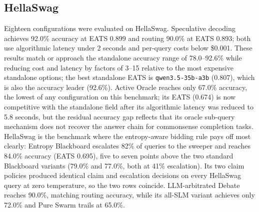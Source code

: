\subsection{HellaSwag}

Eighteen configurations were evaluated on HellaSwag. Speculative decoding achieves 92.0\% accuracy at EATS 0.899 and routing 90.0\% at EATS 0.893; both use algorithmic latency under 2 seconds and per-query costs below \$0.001. These results match or approach the standalone accuracy range of 78.0--92.6\% while reducing cost and latency by factors of 3--15 relative to the most expensive standalone options; the best standalone EATS is \texttt{qwen3.5-35b-a3b} (0.807), which is also the accuracy leader (92.6\%). Active Oracle reaches only 67.0\% accuracy, the lowest of any configuration on this benchmark; its EATS (0.674) is now competitive with the standalone field after its algorithmic latency was reduced to 5.8 seconds, but the residual accuracy gap reflects that its oracle sub-query mechanism does not recover the answer chain for commonsense completion tasks. HellaSwag is the benchmark where the entropy-aware bidding rule pays off most clearly: Entropy Blackboard escalates 82\% of queries to the sweeper and reaches 84.0\% accuracy (EATS 0.695), five to seven points above the two standard Blackboard variants (79.0\% and 77.0\%, both at 41\% escalation). Its two claim policies produced identical claim and escalation decisions on every HellaSwag query at zero temperature, so the two rows coincide. LLM-arbitrated Debate reaches 90.0\%, matching routing accuracy, while its all-SLM variant achieves only 72.0\% and Pure Swarm trails at 65.0\%.

